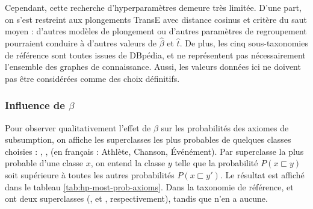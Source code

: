 Cependant, cette recherche d'hyperparamètres demeure très limitée. D'une part, on s'est restreint aux plongements TransE avec distance cosinus et critère du saut moyen : d'autres modèles de plongement ou d'autres paramètres de regroupement pourraient conduire à d'autres valeurs de $\hat{\beta}$ et $\hat{t}$. De plus, les cinq sous-taxonomies de référence sont toutes issues de DBpédia, et ne représentent pas nécessairement l'ensemble des graphes de connaissance. Aussi, les valeurs données ici ne doivent pas être considérées comme des choix définitifs.



\subsubsection{Influence de \texorpdfstring{$\beta$}{beta}}
\label{subsec:te-hp-beta}

Pour observer qualitativement l'effet de $\beta$ sur les probabilités des axiomes de subsumption, on affiche les superclasses les plus probables de quelques classes choisies : , ,  (en français : Athlète, Chanson, Événément). Par superclasse la plus probable d'une classe $x$, on entend la classe $y$ telle que la probabilité $P(x \sqsubset y)$ soit supérieure à toutes les autres probabilités $P(x \sqsubset y')$. Le résultat est affiché dans le tableau \ref{tab:hp-most-prob-axioms}. Dans la taxonomie de référence,  et  ont deux superclasses (,  et ,  respectivement), tandis que  n'en a aucune.


